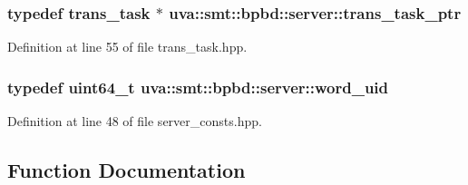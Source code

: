 \hypertarget{namespaceuva_1_1smt_1_1bpbd_1_1server_a4dea4bb1185fe5d148be18ad12fea74a}{}
\subsubsection[{trans\+\_\+task\+\_\+ptr}]{\setlength{\rightskip}{0pt plus 5cm}typedef {\bf trans\+\_\+task} $\ast$ {\bf uva\+::smt\+::bpbd\+::server\+::trans\+\_\+task\+\_\+ptr}}\label{namespaceuva_1_1smt_1_1bpbd_1_1server_a4dea4bb1185fe5d148be18ad12fea74a}


Definition at line 55 of file trans\+\_\+task.\+hpp.

\hypertarget{namespaceuva_1_1smt_1_1bpbd_1_1server_a6bfe45ba344d65a7fdd7d26156328ddc}{}
\subsubsection[{word\+\_\+uid}]{\setlength{\rightskip}{0pt plus 5cm}typedef uint64\+\_\+t {\bf uva\+::smt\+::bpbd\+::server\+::word\+\_\+uid}}\label{namespaceuva_1_1smt_1_1bpbd_1_1server_a6bfe45ba344d65a7fdd7d26156328ddc}


Definition at line 48 of file server\+\_\+consts.\+hpp.



\subsection{Function Documentation}
\hypertarget{namespaceuva_1_1smt_1_1bpbd_1_1server_af54c3a6ef0c3b7ef3c01ec359b4e2d43}{}
